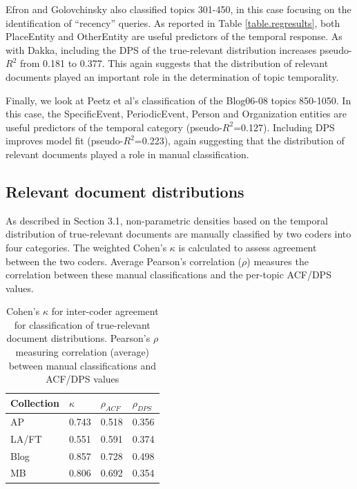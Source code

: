 \documentclass{sig-alternate}
\begin{document}
Efron and Golovchinsky \cite{Efron2011} also classified topics 301-450, in this case focusing on the identification of ``recency'' queries. As reported in Table \ref{table.regresults}, both PlaceEntity and OtherEntity are useful predictors of the temporal response. As with Dakka, including the DPS of the true-relevant distribution increases pseudo-$R^2$ from 0.181 to 0.377. This again suggests that the distribution of relevant documents played an important role in the determination of topic temporality.

Finally, we look at Peetz et al's \cite{Peetz2013a} classification of the Blog06-08 topics 850-1050. In this case, the SpecificEvent, PeriodicEvent, Person and Organization entities are useful predictors of the temporal category (pseudo-$R^2$=0.127). Including DPS  improves model fit (pseudo-$R^2$=0.223), again suggesting that the distribution of relevant documents played a role in manual classification.

\subsection{Relevant document distributions}

As described in Section 3.1, non-parametric densities based on the temporal distribution of true-relevant documents are manually classified by two coders into four categories.  The weighted Cohen's $\kappa$ is calculated to assess agreement between the two coders.  Average Pearson's correlation ($\rho$) measures the correlation between these manual classifications and the per-topic ACF/DPS values.  

\begin{table}
\centering
\begin{tabular}{| l | l | l | l | } \hline
\bf{Collection} & \bf{$\kappa$}  & \bf{$\rho_{ACF}$} & \bf{$\rho_{DPS}$} \\ \hline
AP 	   & 0.743 & 0.518 & 0.356 \\ \hline
LA/FT & 0.551 & 0.591 & 0.374 \\ \hline
Blog    & 0.857 & 0.728 & 0.498 \\ \hline
MB      & 0.806 & 0.692 & 0.354 \\ \hline 
\end{tabular}
\caption{Cohen's $\kappa$ for inter-coder agreement for classification of true-relevant document distributions. Pearson's $\rho$ measuring correlation (average) between manual classifications and ACF/DPS values}
\label{table.cor}
\end{table}
\end{document}
